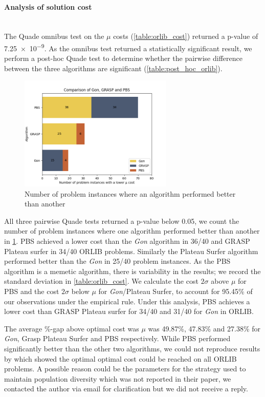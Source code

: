 

\paragraph{Analysis of solution cost}~\\
The Quade omnibus test on the $\mu$ costs (\cref{table:orlib_cost}) returned a p-value of \num{7.25e-9}. As the omnibus test returned a statistically significant result, we perform a post-hoc Quade test to determine whether the pairwise difference between the three algorithms are significant (\cref{table:post_hoc_orlib}).



\begin{figure}[H]
    \centering
    \includegraphics[width=0.65\textwidth]{images/compare_three_alg.png}
    \caption{Number of problem instances where an algorithm performed better than another}
    \label{fig:compare_three_alg}
\end{figure}

All three pairwise Quade tests returned a p-value below 0.05, we count the number of problem instances where one algorithm performed better than another in \cref{fig:compare_three_alg}. PBS achieved a lower cost than the \emph{Gon} algorithm in 36/40 and GRASP Plateau surfer in 34/40 ORLIB problems. Similarly the Plateau Surfer algorithm performed better than the \emph{Gon} in 25/40 problem instances. As the PBS algorithm is a memetic algorithm, there is variability in the results; we record the standard deviation in \cref{table:orlib_cost}. We calculate the cost $2\sigma$ above $\mu$ for PBS and the cost $2\sigma$ below $\mu$ for \emph{Gon}/Plateau Surfer, to account for 95.45\% of our observations under the empirical rule. Under this analysis, PBS achieves a lower cost than GRASP Plateau surfer for 34/40 and 31/40 for \emph{Gon} in ORLIB.

The average \%-gap above optimal cost was $\mu$ was 49.87\%, 47.83\% and 27.38\% for \emph{Gon}, Grasp Plateau Surfer and PBS respectively. While PBS performed significantly better than the other two algorithms, we could not reproduce results by \cite{pullan_memetic_2008} which showed the optimal optimal cost could be reached on all ORLIB problems. A possible reason could be the parameters for the strategy used to maintain population diversity which was not reported in their paper, we contacted the author via email for clarification but we did not receive a reply.